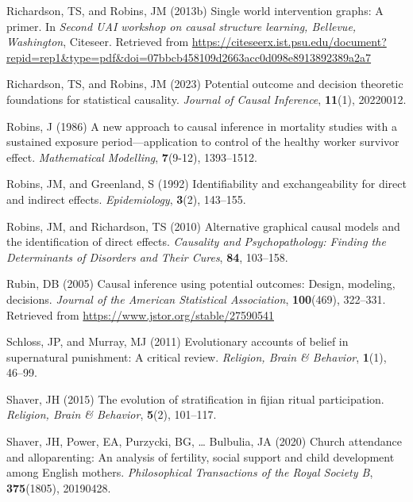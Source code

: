\documentclass[
  single column]{article}
\newlength{\cslhangindent}
\newenvironment{CSLReferences}[2] %
 {\begin{list}{}{%
  \setlength{\itemindent}{0pt}
  \setlength{\leftmargin}{0pt}
  \setlength{\parsep}{0pt}
  \ifodd #1
   \setlength{\leftmargin}{\cslhangindent}
   \setlength{\itemindent}{-1\cslhangindent}
  \fi
  \setlength{\itemsep}{#2\baselineskip}}}
 {\end{list}}
\begin{document}
\begin{CSLReferences}{1}{0}
Richardson, TS, and Robins, JM (2013b) Single world intervention graphs:
A primer. In \emph{Second UAI workshop on causal structure learning,
{B}ellevue, {W}ashington}, Citeseer. Retrieved from
\url{https://citeseerx.ist.psu.edu/document?repid=rep1&type=pdf&doi=07bbcb458109d2663acc0d098e8913892389a2a7}

Richardson, TS, and Robins, JM (2023) Potential outcome and decision
theoretic foundations for statistical causality. \emph{Journal of Causal
Inference}, \textbf{11}(1), 20220012.

Robins, J (1986) A new approach to causal inference in mortality studies
with a sustained exposure period---application to control of the healthy
worker survivor effect. \emph{Mathematical Modelling}, \textbf{7}(9-12),
1393--1512.

Robins, JM, and Greenland, S (1992) Identifiability and exchangeability
for direct and indirect effects. \emph{Epidemiology}, \textbf{3}(2),
143--155.

Robins, JM, and Richardson, TS (2010) Alternative graphical causal
models and the identification of direct effects. \emph{Causality and
Psychopathology: Finding the Determinants of Disorders and Their Cures},
\textbf{84}, 103--158.

Rubin, DB (2005) Causal inference using potential outcomes: Design,
modeling, decisions. \emph{Journal of the American Statistical
Association}, \textbf{100}(469), 322--331. Retrieved from
\url{https://www.jstor.org/stable/27590541}

Schloss, JP, and Murray, MJ (2011) Evolutionary accounts of belief in
supernatural punishment: A critical review. \emph{Religion, Brain \&
Behavior}, \textbf{1}(1), 46--99.

Shaver, JH (2015) The evolution of stratification in fijian ritual
participation. \emph{Religion, Brain \& Behavior}, \textbf{5}(2),
101--117.

Shaver, JH, Power, EA, Purzycki, BG, \ldots{} Bulbulia, JA (2020) Church
attendance and alloparenting: An analysis of fertility, social support
and child development among {E}nglish mothers. \emph{Philosophical
Transactions of the Royal Society B}, \textbf{375}(1805), 20190428.


\end{CSLReferences}
\end{document}
